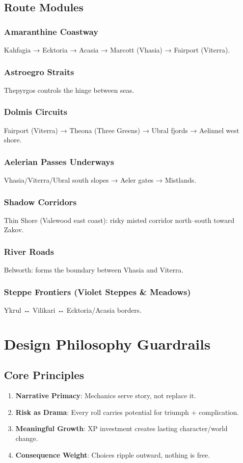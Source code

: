 \documentclass[11pt]{article}
\begin{document}
\subsection{Route Modules}
\subsubsection{Amaranthine Coastway}
Kahfagia → Ecktoria → Acasia → Marcott (Vhasia) → Fairport (Viterra).

\subsubsection{Astroegro Straits}
Thepyrgos controls the hinge between seas.

\subsubsection{Dolmis Circuits}
Fairport (Viterra) → Theona (Three Greens) → Ubral fjords → Aelinnel west shore.

\subsubsection{Aelerian Passes Underways}
Vhasia/Viterra/Ubral south slopes → Aeler gates → Mistlands.

\subsubsection{Shadow Corridors}
Thin Shore (Valewood east coast): risky misted corridor north–south toward Zakov.

\subsubsection{River Roads}
Belworth: forms the boundary between Vhasia and Viterra.

\subsubsection{Steppe Frontiers (Violet Steppes \& Meadows)}
Ykrul ↔ Vilikari ↔ Ecktoria/Acasia borders.

\section{Design Philosophy Guardrails}

\subsection{Core Principles}
\begin{enumerate}
    \item \textbf{Narrative Primacy}: Mechanics serve story, not replace it.
    \item \textbf{Risk as Drama}: Every roll carries potential for triumph + complication.
    \item \textbf{Meaningful Growth}: XP investment creates lasting character/world change.
    \item \textbf{Consequence Weight}: Choices ripple outward, nothing is free.
\end{enumerate}
\end{document}
